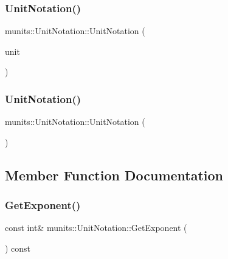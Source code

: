 \subsubsection{\texorpdfstring{Unit\+Notation()}{UnitNotation()}\hspace{0.1cm}{\footnotesize\ttfamily [2/3]}}
{\footnotesize\ttfamily munits\+::\+Unit\+Notation\+::\+Unit\+Notation (\begin{DoxyParamCaption}\item[{std\+::string}]{unit }\end{DoxyParamCaption})\hspace{0.3cm}{\ttfamily [explicit]}}

\mbox{\label{classmunits_1_1_unit_notation_acd2e3877ef117b186e2f4449f0535508}} 
\subsubsection{\texorpdfstring{Unit\+Notation()}{UnitNotation()}\hspace{0.1cm}{\footnotesize\ttfamily [3/3]}}
{\footnotesize\ttfamily munits\+::\+Unit\+Notation\+::\+Unit\+Notation (\begin{DoxyParamCaption}\item[{const \hyperlink{classmunits_1_1_unit_notation}{Unit\+Notation} \&}]{ }\end{DoxyParamCaption})\hspace{0.3cm}{\ttfamily [default]}}



\subsection{Member Function Documentation}
\mbox{\label{classmunits_1_1_unit_notation_a2a567fa1f19879addce7afd4116d02aa}} 
\subsubsection{\texorpdfstring{Get\+Exponent()}{GetExponent()}}
{\footnotesize\ttfamily const int\& munits\+::\+Unit\+Notation\+::\+Get\+Exponent (\begin{DoxyParamCaption}{ }\end{DoxyParamCaption}) const\hspace{0.3cm}{\ttfamily [inline]}}

